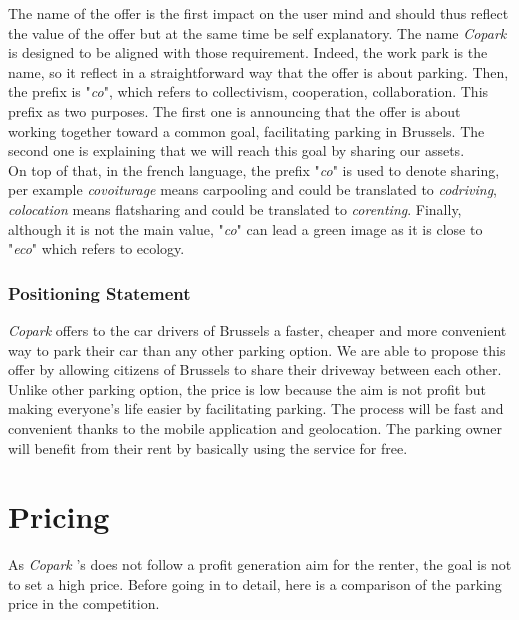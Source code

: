 \documentclass[12pt,a4paper,oneside]{book}
\newcommand{\bp}{\textit{Copark }}
\begin{document}
The name of the offer is the first impact on the user mind and should thus reflect the value of the offer but at the same time be self explanatory. The name \bp is designed to be aligned with those requirement. Indeed, the work park is the name, so it reflect in a straightforward way that the offer is about parking. Then, the prefix is "\textit{co}", which refers to collectivism, cooperation, collaboration. This prefix as two purposes. The first one is announcing that the offer is about working together toward a common goal, facilitating parking in Brussels. The second one is explaining that we will reach this goal by sharing our assets.\\
On top of that, in the french language, the prefix "\textit{co}" is used to denote sharing, per example \textit{covoiturage} means carpooling and could be translated to \textit{codriving}, \textit{colocation} means flatsharing and could be translated to \textit{corenting}. Finally, although it is not the main value, "\textit{co}" can lead a green image as it is close to "\textit{eco}" which refers to ecology.

\subsubsection{Positioning Statement}

\bp offers to the car drivers of Brussels a faster, cheaper and more convenient way to park their car than any other parking option. We are able to propose this offer by allowing citizens of Brussels to share their driveway between each other. Unlike other parking option, the price is low because the aim is not profit but making everyone's life easier by facilitating parking. The process will be fast and convenient thanks to the mobile application and geolocation. The parking owner will benefit from their rent by basically using the service for free. 

\section{Pricing}
\label{priceana}

As \bp's does not follow a profit generation aim for the renter, the goal is not to set a high price. Before going in to detail, here is a comparison of the parking price in the competition.
\end{document}
